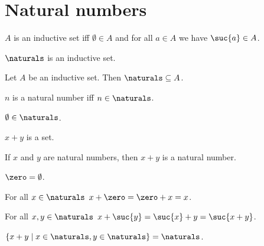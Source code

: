 \section{Natural numbers}

\begin{abbreviation}\label{num_inductive_set}
    $A$ is an inductive set iff $\emptyset\in A$ and for all $a\in A$ we have $\suc{a}\in A$.
\end{abbreviation}

\begin{axiom}\label{num_naturals_inductive_set}
    $\naturals$ is an inductive set.
\end{axiom}

\begin{axiom}\label{num_naturals_smallest_inductive_set}
    Let $A$ be an inductive set.
    Then $\naturals\subseteq A$.
\end{axiom}

\begin{abbreviation}\label{num_naturalnumber}
    $n$ is a natural number iff $n\in \naturals$.
\end{abbreviation}

\begin{lemma}\label{num_emptyset_in_naturals}
    $\emptyset\in\naturals$.    
\end{lemma}

\begin{signature}\label{num_addition_is_set}
    $x+y$ is a set.
\end{signature}

\begin{axiom}\label{num_addition_on_naturals}
    If $x$ and $y$ are natural numbers, then $x + y$ is a natural number.
\end{axiom}

\begin{abbreviation}\label{num_zero_is_emptyset}
    $\zero = \emptyset$.
\end{abbreviation}

\begin{axiom}\label{num_addition_axiom_1}
    For all $x \in \naturals$ $x + \zero = \zero + x = x$.
\end{axiom}

\begin{axiom}\label{num_addition_axiom_2}
    For all $x, y \in \naturals$ $x + \suc{y} = \suc{x} + y = \suc{x+y}$.
\end{axiom}

\begin{lemma}\label{num_naturals_is_equal_to_two_times_naturals}
    $\{x+y \mid x \in \naturals, y \in \naturals \} = \naturals$.
\end{lemma}



